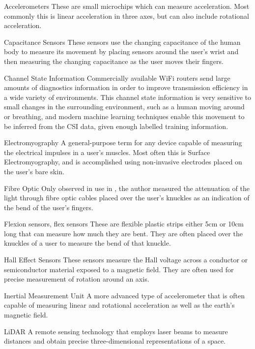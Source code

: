 \begin{Nomencl}[1cm]
\label{sym:tech}%
    \item[Accelerometers] These are small microchips which can measure acceleration. Most commonly this is linear acceleration in three axes, but can also include rotational acceleration.
    \item[Capacitance Sensors] These sensors use the changing capacitance of the human body to measure its movement by placing sensors around the user's wrist and then measuring the changing capacitance as the user moves their fingers.
    \item[Channel State Information] Commercially available WiFi routers send large amounts of diagnostics information in order to improve transmission efficiency in a wide variety of environments. This channel state information is very sensitive to small changes in the surrounding environment, such as a human moving around or breathing, and modern machine learning techniques enable this movement to be inferred from the CSI data, given enough labelled training information.
    \item[Electromyography] A general-purpose term for any device capable of measuring the electrical impulses in a user's muscles. Most often this is Surface Electromyography, and is accomplished using non-invasive electrodes placed on the user's bare skin.
    \item[Fibre Optic] Only observed in use in \cite{wiseEvaluationFiberOptic1990}, the author measured the attenuation of the light through fibre optic cables placed over the user's knuckles as an indication of the bend of the user's fingers.
    \item[Flexion sensors, flex sensors] These are flexible plastic strips either 5cm or 10cm long that can measure how much they are bent. They are often placed over the knuckles of a user to measure the bend of that knuckle.
    \item[Hall Effect Sensors] These sensors measure the Hall voltage across a conductor or semiconductor material exposed to a magnetic field. They are often used for precise measurement of rotation around an axis.
    \item[Inertial Measurement Unit] A more advanced type of accelerometer that is often capable of measuring linear and rotational acceleration as well as the earth's magnetic field.
    \item[LiDAR] A remote sensing technology that employs laser beams to measure distances and obtain precise three-dimensional representations of a space.

\end{Nomencl}
